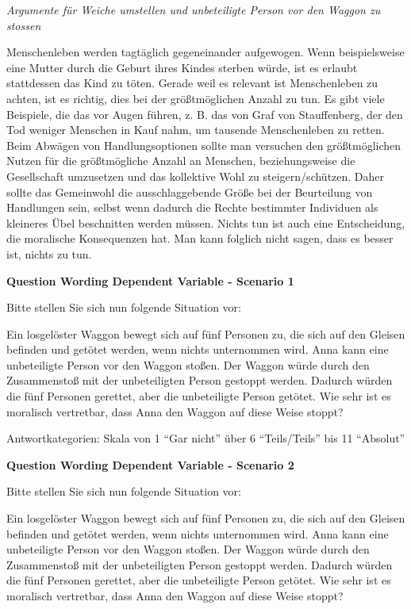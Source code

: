 \textit{Argumente für Weiche umstellen und unbeteiligte Person vor den Waggon zu stossen}

Menschenleben werden tagtäglich gegeneinander aufgewogen. Wenn beispielsweise eine Mutter durch die Geburt ihres Kindes sterben würde, ist es erlaubt stattdessen das Kind zu töten. Gerade weil es relevant ist Menschenleben zu achten, ist es richtig, dies bei der größtmöglichen Anzahl zu tun. Es gibt viele Beispiele, die das vor Augen führen, z. B. das von Graf von Stauffenberg, der den Tod weniger Menschen in Kauf nahm, um tausende Menschenleben zu retten.
Beim Abwägen von Handlungsoptionen sollte man versuchen den größtmöglichen Nutzen für die größtmögliche Anzahl an Menschen, beziehungsweise die Gesellschaft umzusetzen und das kollektive Wohl zu steigern/schützen. Daher sollte das Gemeinwohl die ausschlaggebende Größe bei der Beurteilung von Handlungen sein, selbst wenn dadurch die Rechte bestimmter Individuen als kleineres Übel beschnitten werden müssen.
Nichts tun ist auch eine Entscheidung, die moralische Konsequenzen hat. Man kann folglich nicht sagen, dass es besser ist, nichts zu tun.


\textbf{Question Wording Dependent Variable - Scenario 1}

Bitte stellen Sie sich nun folgende Situation vor:

Ein losgelöster Waggon bewegt sich auf fünf Personen zu, die sich auf den Gleisen befinden und getötet werden, wenn nichts unternommen wird. Anna kann eine unbeteiligte Person vor den Waggon stoßen. Der Waggon würde durch den Zusammenstoß mit der unbeteiligten Person gestoppt werden. Dadurch würden die fünf Personen gerettet, aber die unbeteiligte Person getötet.
Wie sehr ist es moralisch vertretbar, dass Anna den Waggon auf diese Weise stoppt?

Antwortkategorien: Skala von 1 “Gar nicht” über  6 “Teils/Teils” bis 11 “Absolut”


\textbf{Question Wording Dependent Variable - Scenario 2}

Bitte stellen Sie sich nun folgende Situation vor:

Ein losgelöster Waggon bewegt sich auf fünf Personen zu, die sich auf den Gleisen befinden und getötet werden, wenn nichts unternommen wird. Anna kann eine unbeteiligte Person vor den Waggon stoßen. Der Waggon würde durch den Zusammenstoß mit der unbeteiligten Person gestoppt werden. Dadurch würden die fünf Personen gerettet, aber die unbeteiligte Person getötet.
Wie sehr ist es moralisch vertretbar, dass Anna den Waggon auf diese Weise stoppt?

